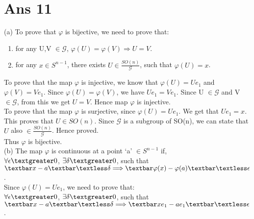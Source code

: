 \documentclass[10pt]{article}
\begin{document}
\section*{Ans 11}
\begin{flushleft}
(a) To prove that $\varphi$ is bijective, we need to prove that:\\
\vspace{0.5em}
\begin{enumerate}
\item for any U,V $\in \mathcal{G}$, $\varphi(U) = \varphi(V) \Longrightarrow U = V$. 
\item for any $x \in S^{n-1}$, there exists $U \in \frac{SO(n)}{\mathcal{G}}$, such that $\varphi(U) = x$.
\end{enumerate}
To prove that the map $\varphi$ is injective, we know that $\varphi(U) = U e_{1}$ and $\varphi(V) = V e_{1}$. Since $\varphi(U) = \varphi(V)$, we have $U e_{1} = V e_{1}$. Since U $\in \mathcal{G}$ and V $\in \mathcal{G}$, from this we get $U=V$. Hence map $\varphi$ is injective.\\
\vspace{0.5em}
To prove that the map $\varphi$ is surjective, since $\varphi(U) = U e_{1}$. We get that $U e_{1} = x$. This proves that $U \in SO(n)$. Since $\mathcal{G}$ is a subgroup of SO(n), we can state that $U$ also $\in \frac{SO(n)}{\mathcal{G}}$. Hence proved.\\
\vspace{0.5em}
Thus $\varphi$ is bijective.\\
\vspace{0.5em}
(b) The map $\varphi$ is continuous at a point `a' $\in S^{n-1}$ if,\\
\vspace{0.5em}
$\forall \epsilon \textgreater 0$, $\exists \delta \textgreater 0$, such that $\textbar x - a \textbar \textless \delta \Longrightarrow \textbar \varphi(x) - \varphi(a) \textbar \textless \epsilon$.\\
\vspace{0.5em}
Since $\varphi(U) = U e_{1}$, we need to prove that:\\
\vspace{0.5em}
$\forall \epsilon \textgreater 0$, $\exists \delta \textgreater 0$, such that $\textbar x - a \textbar \textless \delta \Longrightarrow \textbar x e_{1} - a e_{1} \textbar \textless \epsilon$.
\end{flushleft}
\end{document}
